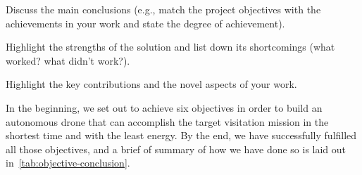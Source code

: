 \documentclass[../main.tex]{subfiles}
\begin{document}
\begin{newrequirements}
    \begin{todolist}
    \item[\done] Discuss the main conclusions (e.g., 
        match the project objectives with the 
        achievements in your work and state the 
        degree of achievement). 

    \item[\done] Highlight the strengths of the solution 
        and list down its shortcomings (what 
        worked? what didn’t work?). 

    \item[\done] Highlight the key contributions and the 
        novel aspects of your work. 

    \end{todolist}
\end{newrequirements}

In the beginning, we set out to achieve six objectives in order to
build an autonomous drone that can accomplish the target visitation
mission in the shortest time and with the least energy.
By the end, we have successfully fulfilled all those objectives, and
a brief of summary of how we have done so is laid out
in~\cref{tab:objective-conclusion}.
\end{document}
